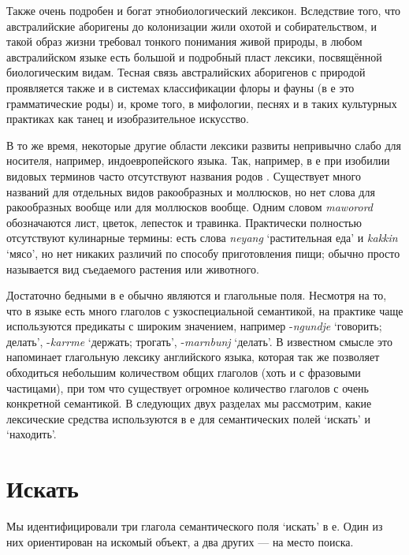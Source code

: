 Также очень подробен и богат этнобиологический лексикон. Вследствие того, что австралийские аборигены до колонизации жили охотой и собирательством, и такой образ жизни требовал тонкого понимания живой природы, в любом австралийском языке есть большой и подробный пласт лексики, посвящённой биологическим видам. Тесная связь австралийских аборигенов с природой проявляется также и в системах классификации флоры и фауны (в  е это грамматические роды) и, кроме того, в мифологии, песнях и в таких культурных практиках как танец и изобразительное искусство.

В то же время, некоторые другие области лексики развиты непривычно слабо для носителя, например, индоевропейского языка. Так, например, в  е при изобилии видовых терминов часто отсутствуют названия родов \autocite[Об этом в австралийских языках вообще см.][\S2.1, и цитируемые там источники]{gabysinger14}. Существует много названий для отдельных видов ракообразных и моллюсков, но нет слова для ракообразных вообще или для моллюсков вообще. Одним словом \textit{maworord} обозначаются лист, цветок, лепесток и травинка. Практически полностью отсутствуют кулинарные термины: есть слова \textit{neyang} `растительная еда' и \textit{kakkin} `мясо', но нет никаких различий по способу приготовления пищи; обычно просто называется вид съедаемого растения или животного.

Достаточно бедными в  е обычно являются и глагольные поля.
Несмотря на то, что в языке есть много глаголов с узкоспециальной семантикой, на практике чаще используются предикаты с широким значением, например -\textit{ngundje} `говорить; делать', -\textit{karrme} `держать; трогать', -\textit{marnbunj} `делать'. В известном смысле это напоминает глагольную лексику английского языка, которая так же позволяет обходиться небольшим количеством общих глаголов (хоть и с фразовыми частицами), при том что существует огромное количество глаголов с очень конкретной семантикой. В следующих двух разделах мы рассмотрим, какие лексические средства используются в  е для семантических полей `искать' и `находить'.

\section{Искать}
\label{sec:search}
Мы идентифицировали три глагола семантического поля `искать' в  е. Один из них ориентирован на искомый объект, а два других --- на место поиска.
